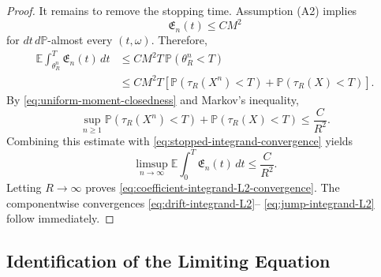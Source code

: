 \documentclass[12pt,oneside, reqno]{amsart}
\numberwithin{equation}{section}
\begin{document}
\begin{proof}
		It remains to remove the stopping time. Assumption
		\textnormal{(A2)} implies
		\[
		\mathfrak E_n(t)\leq CM^2
		\]
		for $dt\,d\mathbb P$-almost every $(t,\omega)$. Therefore,
		\[
		\begin{aligned}
			\mathbb E\int_{\theta_R^n}^T
			\mathfrak E_n(t)\,dt
			&\leq
			CM^2T\,\mathbb P(\theta_R^n<T)
			\\
			&\leq
			CM^2T
			\left[
			\mathbb P(\tau_R(X^n)<T)
			+
			\mathbb P(\tau_R(X)<T)
			\right].
		\end{aligned}
		\]
		By \eqref{eq:uniform-moment-closedness} and Markov's inequality,
		\[
		\sup_{n\geq1}
		\mathbb P(\tau_R(X^n)<T)
		+
		\mathbb P(\tau_R(X)<T)
		\leq
		\frac{C}{R^2}.
		\]
		Combining this estimate with
		\eqref{eq:stopped-integrand-convergence} yields
		\[
		\limsup_{n\to\infty}
		\mathbb E\int_0^T\mathfrak E_n(t)\,dt
		\leq
		\frac{C}{R^2}.
		\]
		Letting $R\to\infty$ proves
		\eqref{eq:coefficient-integrand-L2-convergence}. The componentwise
		convergences
		\eqref{eq:drift-integrand-L2}--
		\eqref{eq:jump-integrand-L2}
		follow immediately.
	\end{proof}
	
	
	
	
	
	
	
	
	
	
	
	
	
	
	
	
	
	
	
	
	
	
	
	
	
	
	
	
	
	\subsection{Identification of the Limiting Equation}
	
\end{document}
